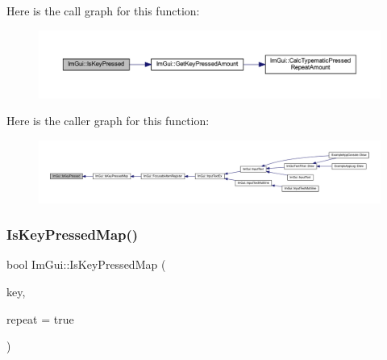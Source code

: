 Here is the call graph for this function\+:
\nopagebreak
\begin{figure}[H]
\begin{center}
\leavevmode
\includegraphics[width=350pt]{namespace_im_gui_a83331a8afa5316bc98ed9c98b151ac01_cgraph}
\end{center}
\end{figure}
Here is the caller graph for this function\+:
\nopagebreak
\begin{figure}[H]
\begin{center}
\leavevmode
\includegraphics[width=350pt]{namespace_im_gui_a83331a8afa5316bc98ed9c98b151ac01_icgraph}
\end{center}
\end{figure}
\mbox{\label{namespace_im_gui_aa4c4806c81aef3abe125b209f19d4a2b}} 
\subsubsection{\texorpdfstring{Is\+Key\+Pressed\+Map()}{IsKeyPressedMap()}}
{\footnotesize\ttfamily bool Im\+Gui\+::\+Is\+Key\+Pressed\+Map (\begin{DoxyParamCaption}\item[{\mbox{\hyperlink{imgui_8h_a1671ca739cf1384a8cc268758f27b4e7}{Im\+Gui\+Key}}}]{key,  }\item[{bool}]{repeat = {\ttfamily true} }\end{DoxyParamCaption})\hspace{0.3cm}{\ttfamily [inline]}}

